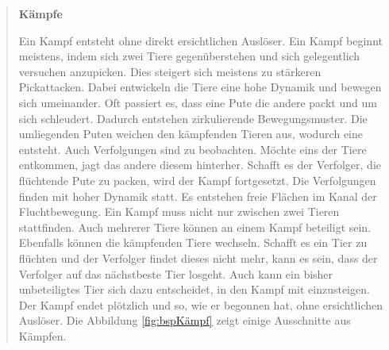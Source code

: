 \begin{quote}
\textbf{Kämpfe}\par
Ein Kampf entsteht ohne direkt ersichtlichen Auslöser. Ein Kampf beginnt meistens, indem sich zwei Tiere gegenüberstehen und sich gelegentlich versuchen anzupicken. Dies steigert sich meistens zu stärkeren Pickattacken. Dabei entwickeln die Tiere eine hohe Dynamik und bewegen sich umeinander. Oft passiert es, dass eine Pute die andere packt und um sich schleudert. Dadurch entstehen zirkulierende Bewegungsmuster. Die umliegenden Puten weichen den kämpfenden Tieren aus, wodurch eine  entsteht. Auch Verfolgungen sind zu beobachten. Möchte eins der Tiere entkommen, jagt das andere diesem hinterher. Schafft es der Verfolger, die flüchtende Pute zu packen, wird der Kampf fortgesetzt. Die Verfolgungen finden mit hoher Dynamik statt. Es entstehen freie Flächen im Kanal der Fluchtbewegung. Ein Kampf muss nicht nur zwischen zwei Tieren stattfinden. Auch mehrerer Tiere können an einem Kampf beteiligt sein. Ebenfalls können die kämpfenden Tiere wechseln. Schafft es ein Tier zu flüchten und der Verfolger findet dieses nicht mehr, kann es sein, dass der Verfolger auf das nächstbeste Tier losgeht. Auch kann ein bisher unbeteiligtes Tier sich dazu entscheidet, in den Kampf mit einzusteigen. Der Kampf endet plötzlich und so, wie er begonnen hat, ohne ersichtlichen Auslöser. Die Abbildung \ref{fig:bspKämpf} zeigt einige Ausschnitte aus Kämpfen.
\end{quote}

